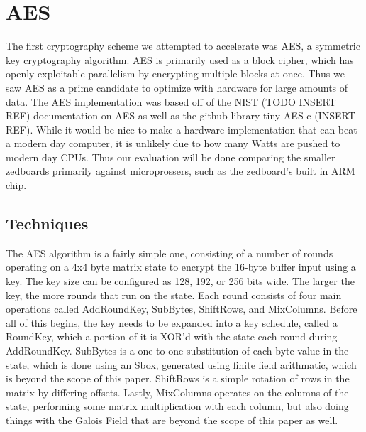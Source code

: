 \section{AES}
The first cryptography scheme we attempted to accelerate was AES, a symmetric key cryptography algorithm. AES is primarily used as a block cipher, which has openly exploitable parallelism by encrypting multiple blocks at once. Thus we saw AES as a prime candidate to optimize with hardware for large amounts of data. The AES implementation was based off of the NIST (TODO INSERT REF) documentation on AES as well as the github library tiny-AES-c (INSERT REF). While it would be nice to make a hardware implementation that can beat a modern day computer, it is unlikely due to how many Watts are pushed to modern day CPUs. Thus our evaluation will be done comparing the smaller zedboards primarily against microprossers, such as the zedboard's built in ARM chip. 

\subsection{Techniques}
The AES algorithm is a fairly simple one, consisting of a number of rounds operating on a 4x4 byte matrix state to encrypt the 16-byte buffer input using a key. The key size can be configured as 128, 192, or 256 bits wide. The larger the key, the more rounds that run on the state. Each round consists of four main operations called AddRoundKey, SubBytes, ShiftRows, and MixColumns. Before all of this begins, the key needs to be expanded into a key schedule, called a RoundKey, which a portion of it is XOR'd with the state each round during AddRoundKey. SubBytes is a one-to-one substitution of each byte value in the state, which is done using an Sbox, generated using finite field arithmatic, which is beyond the scope of this paper. ShiftRows is a simple rotation of rows in the matrix by differing offsets. Lastly, MixColumns operates on the columns of the state, performing some matrix multiplication with each column, but also doing things with the Galois Field that are beyond the scope of this paper as well.  

